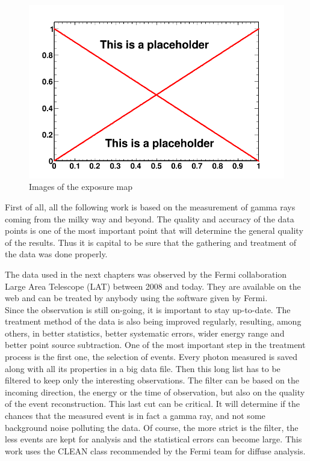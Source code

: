 \begin{figure}
 \centering
 \includegraphics[width=.9\linewidth]{pic/dummy.png}
 \caption{Images of the exposure map}
 \label{fig:proton_spec}
\end{figure}


First of all, all the following work is based on the measurement of gamma rays coming from the milky way and beyond. The quality and accuracy of the data points is one of the most important point that will determine the general quality of the results. Thus it is capital to be sure that the gathering and treatment of the data was done properly.

The data used in the next chapters was observed by the Fermi collaboration Large Area Telescope (LAT) between 2008 and today. They are available on the web and can be treated by anybody using the software given by Fermi.\\

Since the observation is still on-going, it is important to stay up-to-date. The treatment method of the data is also being improved regularly, resulting, among others, in better statistics, better systematic errors, wider energy range and better point source subtraction.
One of the most important step in the treatment process is the first one, the selection of events. Every photon measured is saved along with all its properties in a big data file. Then this long list has to be filtered to keep only the interesting observations. The filter can be based on the incoming direction, the energy or the time of observation, but also on the quality of the event reconstruction. This last cut can be critical. It will determine if the chances that the measured event is in fact a gamma ray, and not some background noise polluting the data. Of course, the more strict is the filter, the less events are kept for analysis and the statistical errors can become large. This work uses the CLEAN class recommended by the Fermi team for diffuse analysis.

